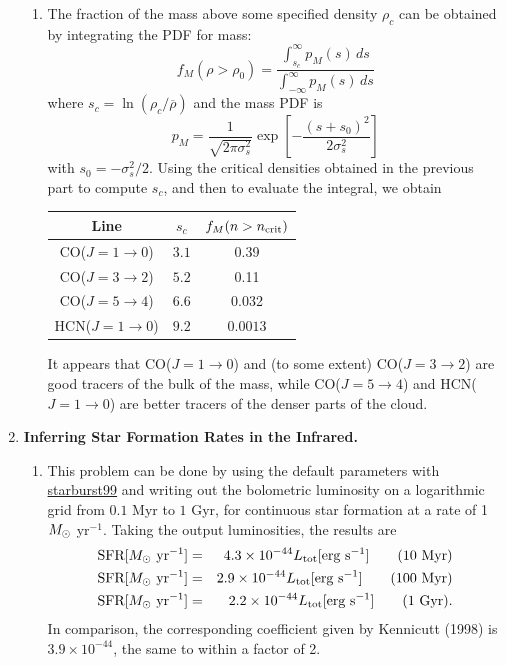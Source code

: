 \begin{enumerate}
\begin{enumerate}
\item 
The fraction of the mass above some specified density $\rho_c$ can be obtained by integrating the PDF for mass:
\begin{equation}
f_M(\rho > \rho_0) = \frac{\int_{s_c}^\infty p_M(s) \, ds}{\int_{-\infty}^{\infty} p_M(s) \, ds}
\end{equation}
where $s_c = \ln(\rho_c/\overline{\rho})$ and the mass PDF is
\begin{equation}
p_M = \frac{1}{\sqrt{2\pi \sigma_s^2}} \exp\left[-\frac{(s+s_0)^2}{2\sigma_s^2}\right]
\end{equation}
with $s_0 = -\sigma_s^2/2$. Using the critical densities obtained in the previous part to compute $s_c$, and then to evaluate the integral, we obtain
\begin{center}
\begin{tabular}{c|c|c}
Line & $s_c$ & $f_M(n>n_{\rm crit})$ \\ \hline
CO($J=1\rightarrow 0$) & $3.1$ & 0.39 \\
CO($J=3\rightarrow 2$) & $5.2$ & 0.11 \\
CO($J=5\rightarrow 4$) & $6.6$ & 0.032 \\
HCN($J=1\rightarrow 0$) & $9.2$ & $0.0013$
\end{tabular}
\end{center}
It appears that CO($J=1\rightarrow 0$) and (to some extent) CO($J=3\rightarrow 2$) are good tracers of the bulk of the mass, while CO($J=5\rightarrow 4$) and HCN($J=1\rightarrow 0$) are better tracers of the denser parts of the cloud.

\end{enumerate}

\item \textbf{Inferring Star Formation Rates in the Infrared.}

\begin{enumerate}

\item 
This problem can be done by using the default parameters with \href{http://www.stsci.edu/~science/starburst99}{starburst99} and writing out the bolometric luminosity on a logarithmic grid from $0.1$ Myr to $1$ Gyr, for continuous star formation at a rate of 1 $M_{\odot}$ yr$^{-1}$. Taking the output luminosities, the results are
\begin{eqnarray*}
\mbox{SFR}[M_{\odot}\mbox{ yr}^{-1}] & = & 4.3\times 10^{-44} L_{\rm tot}[\mbox{erg s}^{-1}]\qquad\mbox{(10 Myr)} \\
\mbox{SFR}[M_{\odot}\mbox{ yr}^{-1}] & = & 2.9\times 10^{-44} L_{\rm tot}[\mbox{erg s}^{-1}]\qquad\mbox{(100 Myr)} \\
\mbox{SFR}[M_{\odot}\mbox{ yr}^{-1}] & = & 2.2\times 10^{-44} L_{\rm tot}[\mbox{erg s}^{-1}]\qquad\mbox{(1 Gyr)}.
\end{eqnarray*}
In comparison, the corresponding coefficient given by Kennicutt (1998) is $3.9\times 10^{-44}$, the same to within a factor of 2.


\end{enumerate}
\end{enumerate}
